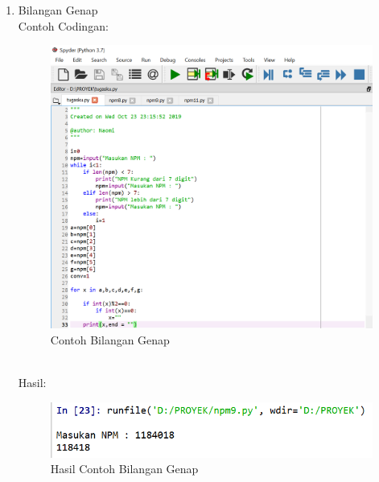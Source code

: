 \begin{enumerate}
    \newpage
    \item Bilangan Genap \\
    Contoh Codingan:
    \begin{figure}[!htbp]
    \centering
    \includegraphics[width=13cm]{gambar2/genap.png}
    \caption{Contoh Bilangan Genap}
    \end{figure}\\
    Hasil:
    \begin{figure}[!htbp]
    \centering
    \includegraphics[width=14cm]{gambar2/genap1.png}
    \caption{Hasil Contoh Bilangan Genap}
    \end{figure}
    

\end{enumerate}

